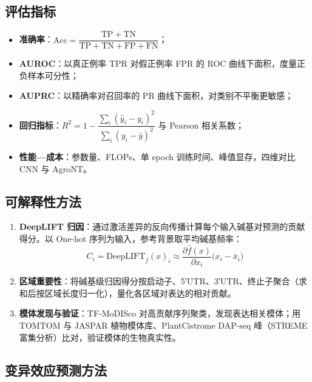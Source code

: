 \documentclass[UTF8,11pt,a4paper]{ctexart}
\begin{document}
\subsection{评估指标}
\label{sec:method-eval}

\begin{itemize}
\item \textbf{准确率}：$\mathrm{Acc} = \dfrac{\mathrm{TP}+\mathrm{TN}}{\mathrm{TP}+\mathrm{TN}+\mathrm{FP}+\mathrm{FN}}$；
\item \textbf{AUROC}：以真正例率 TPR 对假正例率 FPR 的 ROC 曲线下面积，度量正负样本可分性；
\item \textbf{AUPRC}：以精确率对召回率的 PR 曲线下面积，对类别不平衡更敏感；
\item \textbf{回归指标}：$R^2 = 1 - \dfrac{\sum_i(\hat{y}_i-y_i)^2}{\sum_i(y_i-\bar{y})^2}$ 与 Pearson 相关系数；
\item \textbf{性能—成本}：参数量、FLOPs、单 epoch 训练时间、峰值显存，四维对比 CNN 与 AgroNT。
\end{itemize}

\subsection{可解释性方法}
\label{sec:method-interp}

\begin{enumerate}
\item \textbf{DeepLIFT 归因}：通过激活差异的反向传播计算每个输入碱基对预测的贡献得分\cite{shrikumar2017}。以 One-hot 序列为输入，参考背景取平均碱基频率：
\begin{equation}
C_i = \text{DeepLIFT}_f(x)_i \approx \frac{\partial \hat{f}(x)}{\partial x_i}\bigl(x_i - \bar{x}_i\bigr)
\end{equation}
\item \textbf{区域重要性}：将碱基级归因得分按启动子、5′UTR、3′UTR、终止子聚合（求和后按区域长度归一化），量化各区域对表达的相对贡献。
\item \textbf{模体发现与验证}：TF-MoDISco 对高贡献序列聚类，发现表达相关模体；用 TOMTOM 与 JASPAR 植物模体库、PlantCistrome DAP-seq 峰（STREME 富集分析）比对，验证模体的生物真实性\cite{omalley2016}。
\end{enumerate}

\subsection{变异效应预测方法}
\label{sec:method-variant}
\end{document}
